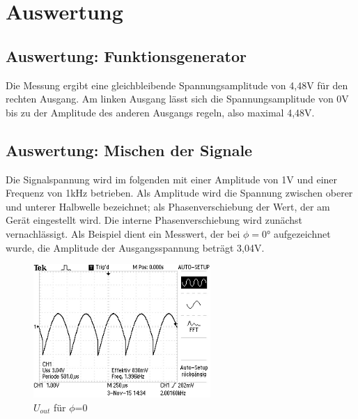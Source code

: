 \section{Auswertung}
\label{sec:Auswertung}

\subsection{Auswertung: Funktionsgenerator}
Die Messung ergibt eine gleichbleibende Spannungsamplitude von 4,48V für den
rechten Ausgang.
Am linken Ausgang lässt sich die Spannungsamplitude von 0V
bis zu der Amplitude des
anderen Ausgangs regeln, also maximal 4,48V.

\subsection{Auswertung: Mischen der Signale}

Die Signalspannung wird im folgenden mit einer Amplitude von 1V und einer
Frequenz von 1kHz betrieben. Als Amplitude wird die Spannung zwischen
oberer und unterer Halbwelle bezeichnet; als Phasenverschiebung der Wert, der am
Gerät eingestellt wird. Die interne Phasenverschiebung wird zunächst
vernachlässigt. Als Beispiel dient ein Messwert, der bei $\phi = 0°$
aufgezeichnet wurde, die Amplitude der Ausgangsspannung beträgt 3,04V.
\begin{figure}[H]
  \centering
  \includegraphics[angle=90,height=0.3\textwidth,width=0.6\textwidth]
  {graphics/ALL0031/F0031TEK.jpg}
  \caption{$U_{out}$ für $\phi$=0}
  \label{fig:2/phi0}
\end{figure}

